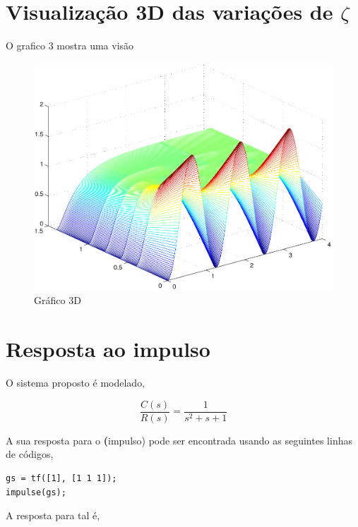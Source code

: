 \documentclass[paper=a4, fontsize=11pt]{article}
\begin{document}
\section{Visualização 3D das variações de $\zeta$}

O grafico 3 mostra uma visão

\begin{figure}[!h]
    \begin{center}
    \includegraphics[scale=.5]{q1p2.pdf}
    \caption{Gráfico 3D}
    \end{center}
\end{figure}


\section{Resposta ao impulso}

O sistema proposto é modelado,

\begin{equation}
    \frac{C(s)}{R(s)} = \frac{1}{s^2+s+1}
\end{equation}

A sua resposta para o \textbf(impulso) pode ser encontrada usando as 
seguintes linhas de códigos,

\begin{lstlisting}
gs = tf([1], [1 1 1]);
impulse(gs);
\end{lstlisting}

A resposta para tal é,
\end{document}
